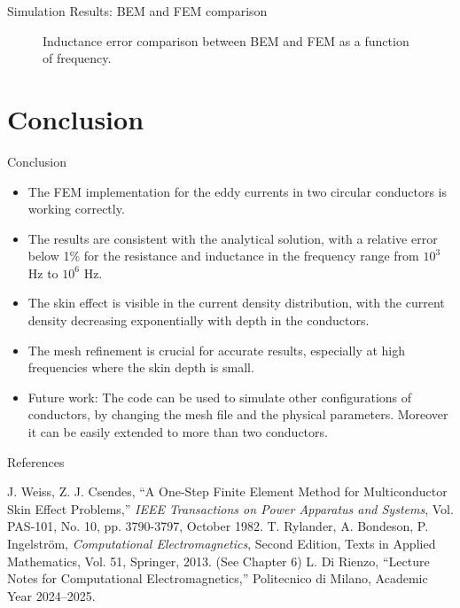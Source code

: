 \documentclass[aspectratio=54,xcolor=dvipsnames]{beamer}
\begin{document}
\begin{frame}{Simulation Results: BEM and FEM comparison}
\begin{center}
\begin{minipage}{0.49\textwidth}
\begin{figure}[H]
            \caption{Inductance error comparison between BEM and FEM as a function of frequency.}
        \end{figure}
    \end{minipage}
    \end{center}
\end{frame}

\section{Conclusion}
\begin{frame}{Conclusion}
    \small
    \begin{itemize}
        \item The FEM implementation for the eddy currents in two circular conductors is working correctly.
        \item The results are consistent with the analytical solution, with a relative error below 1\% for the resistance and inductance in the frequency range from $10^3$ Hz to $10^6$ Hz.
        \item The skin effect is visible in the current density distribution, with the current density decreasing exponentially with depth in the conductors.
        \item The mesh refinement is crucial for accurate results, especially at high frequencies where the skin depth is small.
        \item Future work: The code can be used to simulate other configurations of conductors, by changing the mesh file and the physical parameters. Moreover it can be easily extended to more than two conductors.
    \end{itemize}
\end{frame}

\begin{frame}{References}
    \footnotesize
    \begin{thebibliography}{99}
         J. Weiss, Z. J. Csendes, ``A One-Step Finite Element Method for Multiconductor Skin Effect Problems,'' \emph{IEEE Transactions on Power Apparatus and Systems}, Vol. PAS-101, No. 10, pp. 3790-3797, October 1982.
        T. Rylander, A. Bondeson, P. Ingelström, \emph{Computational Electromagnetics}, Second Edition, Texts in Applied Mathematics, Vol. 51, Springer, 2013. (See Chapter 6)
        L. Di Rienzo, ``Lecture Notes for Computational Electromagnetics,'' Politecnico di Milano, Academic Year 2024--2025.
    \end{thebibliography}
\end{frame}
\end{document}
